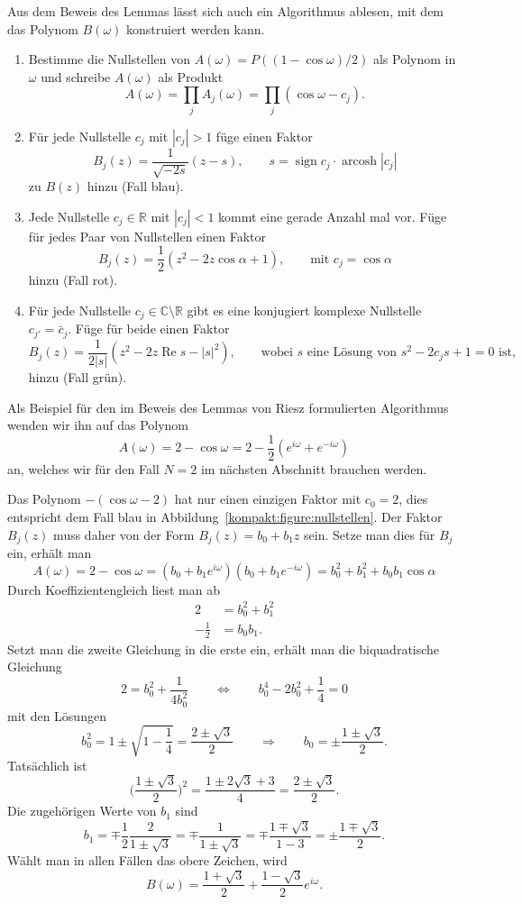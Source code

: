 Aus dem Beweis des Lemmas lässt sich auch ein Algorithmus ablesen, mit
dem das Polynom $B(\omega)$ konstruiert werden kann.
\begin{enumerate}
\item
Bestimme die Nullstellen von $A(\omega) = P((1-\cos \omega)/2)$ 
als Polynom in $\omega$ und schreibe $A(\omega)$ als Produkt
\[
A(\omega)
=
\prod_j A_j(\omega)
=
\prod_j (\cos\omega - c_j).
\]
\item Für jede Nullstelle $c_j$ mit $|c_j|>1$ füge einen Faktor 
\[
B_j(z)=\frac{1}{\sqrt{-2s}}(z-s),\qquad s = \operatorname{sign}c_j\cdot \operatorname{arcosh}|c_j|
\]
zu $B(z)$ hinzu (Fall {\color{blue}blau}).
\item
Jede Nullstelle $c_j \in\mathbb R$ mit $|c_j|<1$ kommt eine gerade Anzahl mal
vor.
Füge für jedes Paar von Nullstellen einen Faktor
\[
B_j(z) = \frac12(z^2 -2 z\cos \alpha +1),
\qquad\text{mit $c_j=\cos\alpha$}
\]
hinzu (Fall {\color{red}rot}).
\item
Für jede Nullstelle $c_j\in \mathbb C\setminus\mathbb R$ gibt es
eine konjugiert komplexe Nullstelle $c_{j'}=\bar{c}_j$.
Füge für beide einen Faktor
\[
B_j(z) = \frac{1}{2|s|}(z^2 -2z\operatorname{Re}s-|s|^2),
\qquad
\text{wobei $s$ eine Lösung von $s^2 -2c_js+1=0$ ist,}
\]
hinzu (Fall {\color{darkgreen}grün}).
\end{enumerate}

\begin{beispiel}
\label{buch:kompakt:db2riesz}
Als Beispiel für den im Beweis des Lemmas von Riesz formulierten Algorithmus
wenden wir ihn auf das Polynom
\[
A(\omega)
=
2-\cos\omega
=
2-\frac12(e^{i\omega}+e^{-i\omega})
\]
an, welches wir für den Fall $N=2$ im nächsten Abschnitt brauchen werden.

Das Polynom $-(\cos\omega -2)$ hat nur einen einzigen Faktor mit $c_0=2$,
dies entspricht dem Fall {\color{blue}blau} in
Abbildung~\ref{kompakt:figure:nullstellen}.
Der Faktor $B_j(z)$ muss daher von der Form $B_j(z)=b_0+b_1z$ sein.
Setze man dies für $B_j$ ein, erhält man
\[
A(\omega)
=
2-\cos\omega
=
(b_0+b_1e^{i\omega})
(b_0+b_1e^{-i\omega})
=
b_0^2 + b_1^2 +b_0b_1\cos\alpha 
\]
Durch Koeffizientengleich liest man ab
\begin{align*}
2&=b_0^2 + b_1^2
\\
-\frac12&=b_0b_1.
\end{align*}
Setzt man die zweite Gleichung in die erste ein, erhält man die biquadratische
Gleichung
\[
2=b_0^2 + \frac{1}{4b_0^2}
\qquad\Leftrightarrow\qquad
b_0^4-2b_0^2 + \frac14 = 0
\]
mit den Lösungen
\[
b_0^2 = 1\pm \sqrt{1-\frac14} = \frac{2\pm\sqrt{3}}{2}
\qquad\Rightarrow\qquad
b_0 = \pm \frac{1\pm\sqrt{3}}2.
\]
Tatsächlich ist
\[
\biggl(
\frac{1\pm\sqrt{3}}2
\biggr)^2
=
\frac{1\pm 2\sqrt{3}+3}{4}
=
\frac{2\pm\sqrt{3}}2.
\]
Die zugehörigen Werte von $b_1$ sind
\[
b_1
=
\mp
\frac{1}{2}\frac{2}{1\pm\sqrt{3}}
=
\mp
\frac{1}{1\pm\sqrt{3}}
=
\mp
\frac{1\mp \sqrt{3}}{1-3}
=
\pm
\frac{1\mp\sqrt{3}}{2}.
\]
Wählt man in allen Fällen das obere Zeichen, wird
\[
B(\omega)
= 
\frac{1+\sqrt{3}}2 + \frac{1-\sqrt{3}}2 e^{i\omega}.
\]
\end{beispiel}


